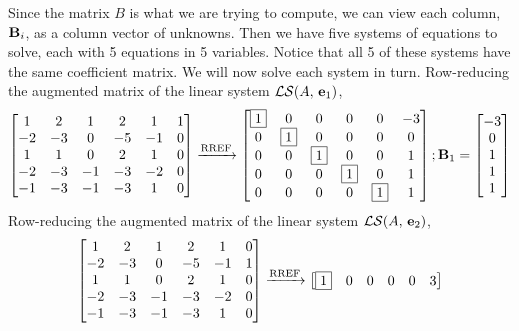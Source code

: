 \documentclass{ximera}
\begin{document}
\begin{example}
Since the matrix $B$ is what we are trying to compute, we can view
each column, $\mathbf{B}_i$, as a column vector of unknowns.  Then we
have five systems of equations to solve, each with 5 equations in 5
variables.  Notice that all 5 of these systems have the same
coefficient matrix.  We will now solve each system in turn.
Row-reducing the augmented matrix of the linear system $\mathcal{LS}\!\left(A,\,\mathbf{e}_1\right)$,
\begin{align*}
  \begin{bmatrix}
    1 & 2 & 1 & 2 & 1 & 1\\
    -2 & -3 & 0 & -5 & -1 & 0\\
    1 & 1 & 0 & 2 & 1 & 0\\
    -2 & -3 & -1 & -3 & -2 & 0\\
    -1 & -3 & -1 & -3 & 1 & 0
  \end{bmatrix}
                            \xrightarrow{\text{RREF}}
                            \begin{bmatrix}
                              \fbox{1} & 0 & 0 & 0 & 0 & -3\\
                              0 & \fbox{1} & 0 & 0 & 0 & 0\\
                              0 & 0 & \fbox{1} & 0 & 0 & 1\\
                              0 & 0 & 0 & \fbox{1} & 0 & 1\\
                              0 & 0 & 0 & 0 & \fbox{1} & 1
                            \end{bmatrix}
                                                            ;
                                                            \mathbf{B}_1=\begin{bmatrix}-3\\0\\1\\1\\1\end{bmatrix}\\
\end{align*}
Row-reducing the augmented matrix of the linear system $\mathcal{LS}\!\left(A,\,\mathbf{e}_2\right)$,
\begin{align*}
\begin{bmatrix}
 1 & 2 & 1 & 2 & 1 & 0\\
 -2 & -3 & 0 & -5 & -1 & 1\\
 1 & 1 & 0 & 2 & 1 & 0\\
 -2 & -3 & -1 & -3 & -2 & 0\\
 -1 & -3 & -1 & -3 & 1 & 0
\end{bmatrix}
\xrightarrow{\text{RREF}}
\begin{bmatrix}
\fbox{1} & 0 & 0 & 0 & 0 & 3\\

\end{bmatrix}
\end{align*}
\end{example}
\end{document}
